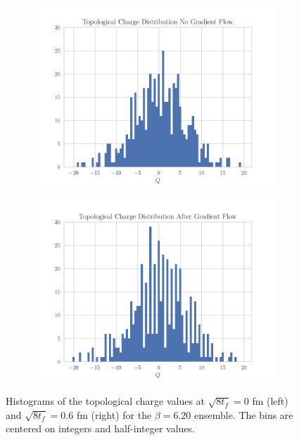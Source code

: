 \begin{figure}[hbt!]
    \centering
    \begin{subfigure}{0.45\textwidth}
        \includegraphics[width=\textwidth]{results/TopcHistNoFlow.pdf}
    \end{subfigure}
    \begin{subfigure}{0.45\textwidth}
        \includegraphics[width=\textwidth]{results/TopcHistFlow.pdf}
    \end{subfigure}
    \caption{\footnotesize Histograms of the topological charge values at $\sqrt{8t_f} = 0$ fm (left) and $\sqrt{8t_f} = 0.6$ fm (right) for the $\beta=6.20$ ensemble. The bins are centered on integers and half-integer values.}
    \label{fig:topchist}
\end{figure} 

